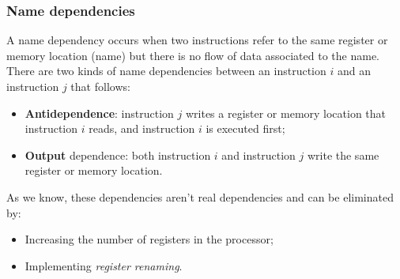 \documentclass[a4paper,11pt]{article}
\begin{document}
\subsubsection{Name dependencies}

A name dependency occurs when two instructions refer
to the same register or memory location (name) but
there is no flow of data associated to the name.
There are two kinds of name dependencies between an
instruction $i$ and an instruction $j$ that follows:

\begin{itemize}
	\item \textbf{Antidependence}: instruction $j$ writes a register or
	      memory location that instruction $i$ reads, and
	      instruction $i$ is executed first;
	\item \textbf{Output} dependence: both instruction $i$ and
	      instruction $j$ write the same register or memory
	      location.
\end{itemize}

As we know, these dependencies aren't real dependencies and can be eliminated by:
\begin{itemize}
	\item Increasing the number of registers in the processor;
	\item Implementing \textit{register renaming}.
\end{itemize}
\end{document}

